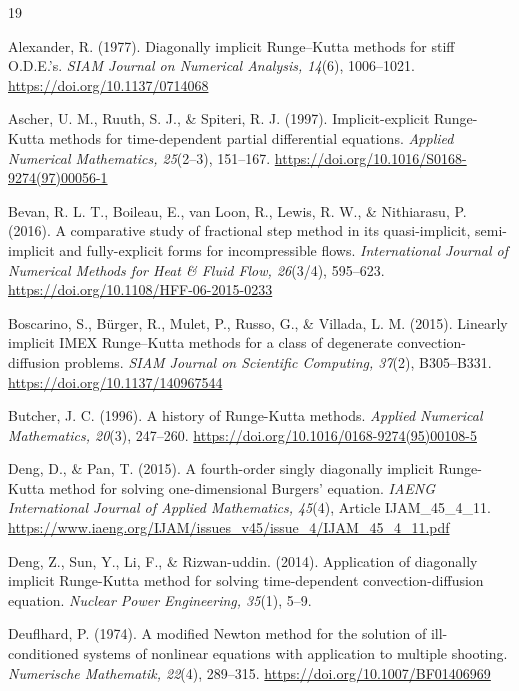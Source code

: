 \documentclass[final,5p,times,twocolumn,authoryear,11pt]{elsarticle}
\begin{document}
\begin{thebibliography}{19}

Alexander, R. (1977). Diagonally implicit Runge--Kutta methods for stiff O.D.E.'s. \textit{SIAM Journal on Numerical Analysis, 14}(6), 1006--1021. \url{https://doi.org/10.1137/0714068}

Ascher, U. M., Ruuth, S. J., \& Spiteri, R. J. (1997). Implicit-explicit Runge-Kutta methods for time-dependent partial differential equations. \textit{Applied Numerical Mathematics, 25}(2--3), 151--167. \url{https://doi.org/10.1016/S0168-9274(97)00056-1}

Bevan, R. L. T., Boileau, E., van Loon, R., Lewis, R. W., \& Nithiarasu, P. (2016). A comparative study of fractional step method in its quasi-implicit, semi-implicit and fully-explicit forms for incompressible flows. \textit{International Journal of Numerical Methods for Heat \& Fluid Flow, 26}(3/4), 595--623. \url{https://doi.org/10.1108/HFF-06-2015-0233}

Boscarino, S., B{\"u}rger, R., Mulet, P., Russo, G., \& Villada, L. M. (2015). Linearly implicit IMEX Runge--Kutta methods for a class of degenerate convection-diffusion problems. \textit{SIAM Journal on Scientific Computing, 37}(2), B305--B331. \url{https://doi.org/10.1137/140967544}

Butcher, J. C. (1996). A history of Runge-Kutta methods. \textit{Applied Numerical Mathematics, 20}(3), 247--260. \url{https://doi.org/10.1016/0168-9274(95)00108-5}

Deng, D., \& Pan, T. (2015). A fourth-order singly diagonally implicit Runge-Kutta method for solving one-dimensional Burgers' equation. \textit{IAENG International Journal of Applied Mathematics, 45}(4), Article IJAM\_45\_4\_11. \url{https://www.iaeng.org/IJAM/issues_v45/issue_4/IJAM_45_4_11.pdf}

Deng, Z., Sun, Y., Li, F., \& Rizwan-uddin. (2014). Application of diagonally implicit Runge-Kutta method for solving time-dependent convection-diffusion equation. \textit{Nuclear Power Engineering, 35}(1), 5--9.

Deuflhard, P. (1974). A modified Newton method for the solution of ill-conditioned systems of nonlinear equations with application to multiple shooting. \textit{Numerische Mathematik, 22}(4), 289--315. \url{https://doi.org/10.1007/BF01406969}


\end{thebibliography}
\end{document}
